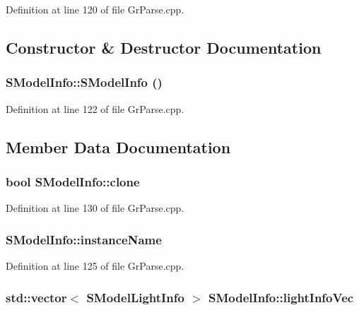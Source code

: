 Definition at line 120 of file GrParse.cpp.

\subsection{Constructor \& Destructor Documentation}
\hypertarget{struct_s_model_info_d590ff26bd110db901f119416d0ecf04}{
\subsubsection[{SModelInfo}]{\setlength{\rightskip}{0pt plus 5cm}SModelInfo::SModelInfo ()}}
\label{struct_s_model_info_d590ff26bd110db901f119416d0ecf04}




Definition at line 122 of file GrParse.cpp.

\subsection{Member Data Documentation}
\hypertarget{struct_s_model_info_cf9ec13cd56151333419dbcc25661151}{
\subsubsection[{clone}]{\setlength{\rightskip}{0pt plus 5cm}bool {\bf SModelInfo::clone}}}
\label{struct_s_model_info_cf9ec13cd56151333419dbcc25661151}




Definition at line 130 of file GrParse.cpp.\hypertarget{struct_s_model_info_e6ba1ebcc415ac7a794853a0910a32d0}{
\subsubsection[{instanceName}]{ {\bf SModelInfo::instanceName}}}
\label{struct_s_model_info_e6ba1ebcc415ac7a794853a0910a32d0}




Definition at line 125 of file GrParse.cpp.\hypertarget{struct_s_model_info_8528cbebf3292b977c3cd481ef32a5ac}{
\subsubsection[{lightInfoVec}]{\setlength{\rightskip}{0pt plus 5cm}std::vector$<$ {\bf SModelLightInfo} $>$ {\bf SModelInfo::lightInfoVec}}}
\label{struct_s_model_info_8528cbebf3292b977c3cd481ef32a5ac}




